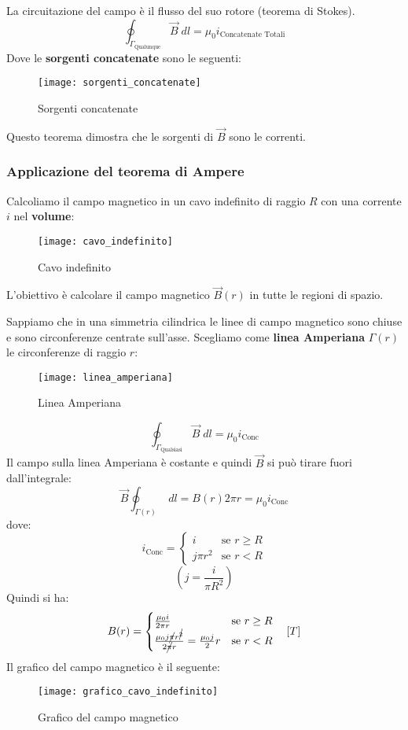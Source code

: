\documentclass[a4paper]{article}
\begin{document}
\begin{theorem}
  La circuitazione del campo è il flusso del suo rotore (teorema di Stokes).
  \[
    \oint_{\Gamma_{\text{Qualunque}}} \vec{B} \; dl = \mu_0 i_{\text{Concatenate Totali}}
  \] 
  Dove le \textbf{sorgenti concatenate} sono le seguenti:
  \begin{figure}[H]
    \centering
    \texttt{[image: sorgenti\_concatenate]}
    \caption{Sorgenti concatenate}
  \end{figure}
  \noindent
  Questo teorema dimostra che le sorgenti di \( \vec{B} \) sono le correnti.
\end{theorem}

\subsubsection{Applicazione del teorema di Ampere}
\begin{example}
  Calcoliamo il campo magnetico in un cavo indefinito di raggio \( R \) con una corrente
  \( i \) nel \textbf{volume}:
  \begin{figure}[H]
    \centering
    \texttt{[image: cavo\_indefinito]}
    \caption{Cavo indefinito}
  \end{figure}
  \noindent
  L'obiettivo è calcolare il campo magnetico \( \vec{B}(r) \) in tutte le regioni di spazio.

  \vspace{1em}
  \noindent
  Sappiamo che in una simmetria cilindrica le linee di campo magnetico sono chiuse e sono
  circonferenze centrate sull'asse.
  Scegliamo come \textbf{linea Amperiana} \( \Gamma(r) \) le circonferenze di raggio \( r \):
  \begin{figure}[H]
    \centering
    \texttt{[image: linea\_amperiana]}
    \caption{Linea Amperiana}
  \end{figure}
  \[
    \oint_{\Gamma_{\text{Qualsiasi}}} \vec{B} \; dl = \mu_0 i_{\text{Conc}}
  \] 
  Il campo sulla linea Amperiana è costante e quindi \( \vec{B} \) si può tirare fuori
  dall'integrale:
  \[
    \vec{B} \oint_{\Gamma(r)} \; dl = B(r) 2 \pi r = \mu_0 i_{\text{Conc}}
  \] 
  dove:
  \[
    i_{\text{Conc}} = \begin{cases}
      i & \text{se } r \ge R \\
      j \pi r^2 & \text{se } r < R
    \end{cases}
  \] 
  \[
   \left( j = \frac{i}{\pi R^2} \right) 
  \] 
  Quindi si ha:
  \[
    B(r) = \begin{cases}
      \frac{\mu_0 i}{2 \pi r} & \text{se } r \ge R \\
      \frac{\mu_0 j \cancel{\pi} r^{\cancel{2}}}{2 \cancel{\pi} r} = \frac{\mu_0 j}{2} r & \text{se } r < R
    \end{cases}
    \quad \left[ T \right]
  \] 
  Il grafico del campo magnetico è il seguente:
  \begin{figure}[H]
    \centering
    \texttt{[image: grafico\_cavo\_indefinito]}
    \caption{Grafico del campo magnetico}
  \end{figure}
\end{example}
\end{document}

